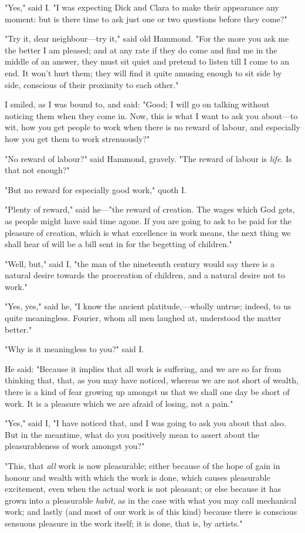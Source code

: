 "Yes," said I. "I was expecting Dick and Clara to make their appearance
any moment: but is there time to ask just one or two questions before
they come?"

"Try it, dear neighbour---try it," said old Hammond. "For the more you
ask me the better I am pleased; and at any rate if they do come and find
me in the middle of an answer, they must sit quiet and pretend to listen
till I come to an end. It won't hurt them; they will find it quite
amusing enough to sit side by side, conscious of their proximity to each
other."

I smiled, as I was bound to, and said: "Good; I will go on talking
without noticing them when they come in. Now, this is what I want to ask
you about---to wit, how you get people to work when there is no reward
of labour, and especially how you get them to work strenuously?"

"No reward of labour?" said Hammond, gravely. "The reward of labour is
\emph{life}. Is that not enough?"

"But no reward for especially good work," quoth I.

"Plenty of reward," said he---"the reward of creation. The wages which
God gets, as people might have said time agone. If you are going to ask
to be paid for the pleasure of creation, which is what excellence in
work means, the next thing we shall hear of will be a bill sent in for
the begetting of children."

"Well, but," said I, "the man of the nineteenth century would say there
is a natural desire towards the procreation of children, and a natural
desire not to work."

"Yes, yes," said he, "I know the ancient platitude,---wholly untrue;
indeed, to us quite meaningless. Fourier, whom all men laughed at,
understood the matter better."

"Why is it meaningless to you?" said I.

He said: "Because it implies that all work is suffering, and we are so
far from thinking that, that, as you may have noticed, whereas we are
not short of wealth, there is a kind of fear growing up amongst us that
we shall one day be short of work. It is a pleasure which we are afraid
of losing, not a pain."

"Yes," said I, "I have noticed that, and I was going to ask you about
that also. But in the meantime, what do you positively mean to assert
about the pleasurableness of work amongst you?"

"This, that \emph{all} work is now pleasurable; either because of the
hope of gain in honour and wealth with which the work is done, which
causes pleasurable excitement, even when the actual work is not
pleasant; or else because it has grown into a pleasurable \emph{habit},
as in the case with what you may call mechanical work; and lastly (and
most of our work is of this kind) because there is conscious sensuous
pleasure in the work itself; it is done, that is, by artists."

